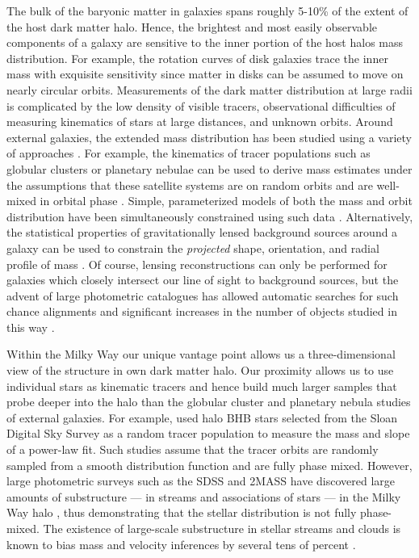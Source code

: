 \documentclass[letterpaper,12pt,preprint]{aastex}
\begin{document}
The bulk of the baryonic matter in galaxies spans roughly 5-10\% of the extent of the host dark matter halo. Hence, the brightest and most easily observable components of a galaxy are sensitive to the inner portion of the host halos mass distribution. For example, the rotation curves of disk galaxies trace the inner mass with exquisite sensitivity since matter in disks can be assumed to move on nearly circular orbits. Measurements of the dark matter distribution at large radii is complicated by the low density of visible tracers, observational difficulties of measuring kinematics of stars at large distances, and unknown orbits. Around external galaxies, the extended mass distribution has been studied using a variety of approaches \citep[see][for a a complete and detailed review]{courteau13}. For example, the kinematics of tracer populations such as globular clusters or planetary nebulae can be used to derive mass estimates under the assumptions that these satellite systems are on random orbits and are well-mixed in orbital phase \citep[early investigations include][]{mendez01,cote03}. Simple, parameterized models of both the mass and orbit distribution have been simultaneously constrained using such data \citep[e.g.][]{napolitano11,deason12c}. Alternatively, the statistical properties of gravitationally lensed background sources around a galaxy can be used to constrain the \emph{projected} shape, orientation, and radial profile of mass \citep[see, for example, the Lens Structure and Dynamics Survey described in][]{koopmans02}. Of course, lensing reconstructions can only be performed for galaxies which closely intersect our line of sight to background sources, but the advent of large photometric catalogues has allowed automatic searches for such chance alignments and significant increases in the number of objects studied in this way \citep[e.g. the Sloan Lens ACS Survey, see][]{bolton06}.

Within the Milky Way our unique vantage point allows us a three-dimensional view of the structure in own dark matter halo. Our proximity allows us to use individual stars as kinematic tracers and hence build much larger samples that probe deeper into the halo than the globular cluster and planetary nebula studies of external galaxies. For example, \cite{deason12a} used halo BHB stars selected from the Sloan Digital Sky Survey \cite[SDSS;][]{york00} as a random tracer population to measure the mass and slope of a power-law fit. Such studies assume that the tracer orbits are randomly sampled from a smooth distribution function and are fully phase mixed. However, large photometric surveys such as the SDSS and 2MASS \citep{skrutskie06} have discovered large amounts of substructure --- in streams and associations of stars --- in the Milky Way halo \citep[e.g.,][]{belokurov06, TODO}, thus demonstrating that the stellar distribution is not fully phase-mixed. The existence of large-scale substructure in stellar streams and clouds is known to bias mass and velocity inferences by several tens of percent \citep{yencho06}.
\end{document}
